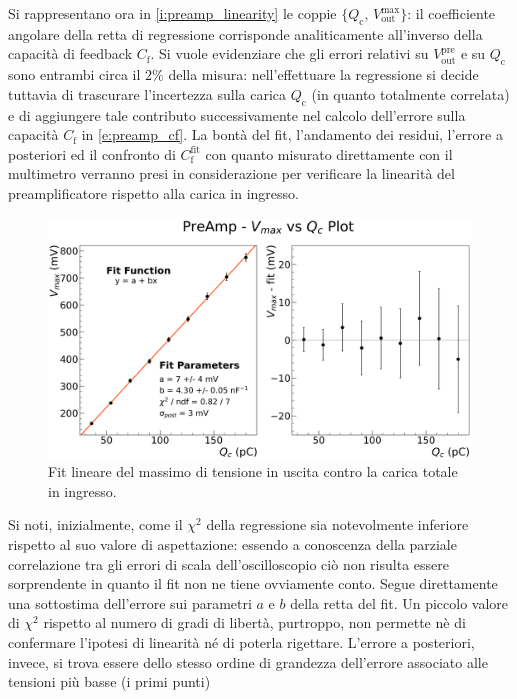 \documentclass[a4paper,11pt]{article} %
\begin{document}
Si rappresentano ora in \autoref{i:preamp_linearity} le coppie $\{Q_{\text{c}},\,V^{\text{max}}_{\text{out}}\}$: il
coefficiente angolare della retta di regressione corrisponde analiticamente all'inverso della capacità di feedback
$C_{\text{f}}$. Si vuole evidenziare che gli errori relativi su $V^{\text{pre}}_{\text{out}}$ e su $Q_{\text{c}}$ sono
entrambi circa il $2\%$ della misura: nell'effettuare la regressione si decide tuttavia di trascurare l'incertezza sulla
carica $Q_{\text{c}}$ (in quanto totalmente correlata) e di aggiungere tale contributo successivamente nel calcolo
dell'errore sulla capacità $C_{\text{f}}$ in \autoref{e:preamp_cf}. La bontà del fit, l'andamento dei residui, l'errore
a posteriori ed il confronto di $C_{\text{f}}^{\text{fit}}$ con quanto misurato direttamente con il multimetro verranno
presi in considerazione per verificare la linearità del preamplificatore rispetto alla carica in ingresso. 
\vspace{-7pt}
\begin{figure}[H]
	\centering
	\includegraphics[width=0.8\linewidth]{../Plots/PreAmp/linearity_fit.png}
	\vspace{-7pt}
	\caption{\small Fit lineare del massimo di tensione in uscita contro la carica totale in ingresso.}
	\label{i:preamp_linearity}
\end{figure}
\vspace{-7pt}
Si noti, inizialmente, come il $\chi^2$ della regressione sia notevolmente inferiore rispetto al suo valore di
aspettazione: essendo a conoscenza della parziale correlazione tra gli errori di scala dell'oscilloscopio ciò non
risulta essere sorprendente in quanto il fit non ne tiene ovviamente conto. Segue direttamente una sottostima
dell'errore sui parametri $a$ e $b$ della retta del fit. Un piccolo valore di $\chi^2$ rispetto al numero di gradi di
libertà, purtroppo, non permette nè di confermare l'ipotesi di linearità né di poterla rigettare. L'errore a posteriori,
invece, si trova essere dello stesso ordine di grandezza dell'errore associato alle tensioni più basse (i primi punti)
\end{document}
